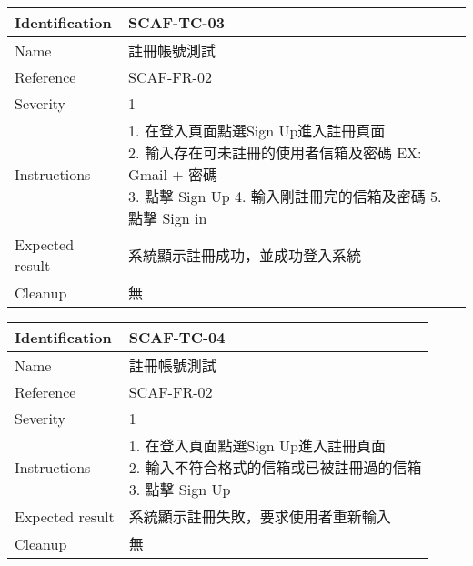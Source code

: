 \documentclass{report}
\begin{document}
\begin{tabularx}{0.9\textwidth}{
  |p{}%
  |p{}|%
  }
  \hline
  \centering Identification &  SCAF-TC-03 \\
  \hline
  \centering Name & 註冊帳號測試 \\
  \hline
  \centering Reference & SCAF-FR-02 \\
  \hline
  \centering Severity & 1 \\
  \hline
  \centering Instructions & 
  \makecell{
    1. 在登入頁面點選Sign Up進入註冊頁面 \\
    2. 輸入存在可未註冊的使用者信箱及密碼 EX: Gmail + 密碼 \\
    3. 點擊 Sign Up
    4. 輸入剛註冊完的信箱及密碼
    5. 點擊 Sign in
  }\\
  \hline
  \centering Expected result & 系統顯示註冊成功，並成功登入系統 \\
  \hline
  \centering Cleanup & 無 \\
  \hline
\end{tabularx}
\newline\newline

\begin{tabularx}{0.9\textwidth}{
  |p{}%
  |p{}|%
  }
  \hline
  \centering Identification &  SCAF-TC-04 \\
  \hline
  \centering Name & 註冊帳號測試 \\
  \hline
  \centering Reference & SCAF-FR-02 \\
  \hline
  \centering Severity & 1 \\
  \hline
  \centering Instructions & 
  \makecell{
    1. 在登入頁面點選Sign Up進入註冊頁面 \\
    2. 輸入不符合格式的信箱或已被註冊過的信箱  \\
    3. 點擊 Sign Up
  }\\
  \hline
  \centering Expected result & 系統顯示註冊失敗，要求使用者重新輸入 \\
  \hline
  \centering Cleanup & 無 \\
  \hline
\end{tabularx}
\newline\newline
\end{document}
